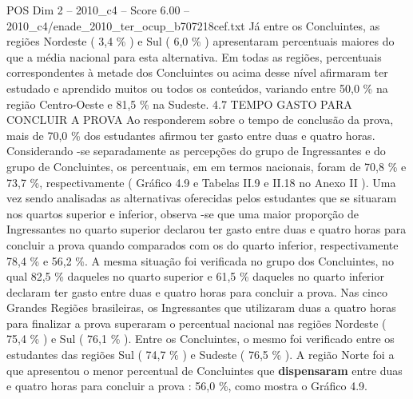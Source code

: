 \begin{textsample}{POS Dim 2 – 2010\_c4 – Score 6.00 – 2010\_c4/enade\_2010\_ter\_ocup\_b707218cef.txt}
Já entre os Concluintes, as regiões Nordeste ( 3,4 \% ) e Sul ( 6,0 \% ) apresentaram percentuais maiores do que a média nacional para esta alternativa.
Em todas as regiões, percentuais correspondentes à metade dos Concluintes ou acima desse nível afirmaram ter estudado e aprendido muitos ou todos os conteúdos, variando entre 50,0 \% na região Centro-Oeste e 81,5 \% na Sudeste. 4.7 TEMPO GASTO PARA CONCLUIR A PROVA Ao responderem sobre o tempo de conclusão da prova, mais de 70,0 \% dos estudantes afirmou ter gasto entre duas e quatro horas.
Considerando -se separadamente as percepções do grupo de Ingressantes e do grupo de Concluintes, os percentuais, em em termos nacionais, foram de 70,8 \% e 73,7 \%, respectivamente ( Gráfico 4.9 e Tabelas II.9 e II.18 no Anexo II ).
Uma vez sendo analisadas as alternativas oferecidas pelos estudantes que se situaram nos quartos superior e inferior, observa -se que uma maior proporção de Ingressantes no quarto superior declarou ter gasto entre duas e quatro horas para concluir a prova quando comparados com os do quarto inferior, respectivamente 78,4 \% e 56,2 \%.
A mesma situação foi verificada no grupo dos Concluintes, no qual 82,5 \% daqueles no quarto superior e 61,5 \% daqueles no quarto inferior declaram ter gasto entre duas e quatro horas para concluir a prova.
Nas cinco Grandes Regiões brasileiras, os Ingressantes que utilizaram duas a quatro horas para finalizar a prova superaram o percentual nacional nas regiões Nordeste ( 75,4 \% ) e Sul ( 76,1 \% ).
Entre os Concluintes, o mesmo foi verificado entre os estudantes das regiões Sul ( 74,7 \% ) e Sudeste ( 76,5 \% ).
A região Norte foi a que apresentou o menor percentual de Concluintes que \textbf{dispensaram} entre duas e quatro horas para concluir a prova : 56,0 \%, como mostra o Gráfico 4.9.

\end{textsample}
